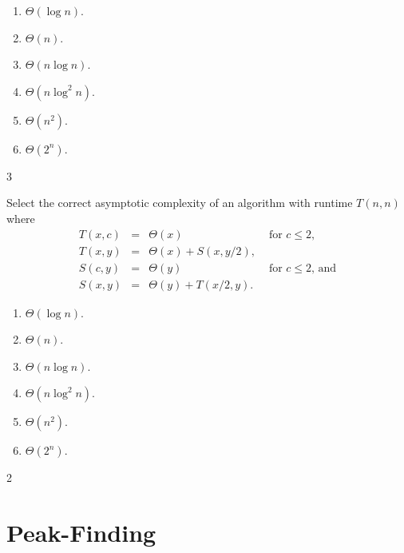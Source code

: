 \documentclass[12pt,twoside]{article}
\begin{document}
\begin{problems}
\begin{problemparts}
        \begin{enumerate}
            \item $\Theta(\log n)$.
            \item $\Theta(n)$.
            \item $\Theta(n \log n)$.
            \item $\Theta(n \log^2 n)$.
            \item $\Theta(n^2)$.
            \item $\Theta(2^n)$.
        \end{enumerate}

        \ifsolution \solution{}
            3
        \fi

        \problempart {}
        Select the correct asymptotic complexity
        of an algorithm with runtime $T(n, n)$
        where 
        $$
            \begin{array}{rcll}
                T(x, c) & = & \Theta(x)                 & \textrm{ for $c \le 2$},     \\
                T(x, y) & = & \Theta(x) + S(x, y / 2),                                 \\
                S(c, y) & = & \Theta(y)                 & \textrm{ for $c \le 2$, and} \\
                S(x, y) & = & \Theta(y) + T(x / 2, y).
            \end{array}
        $$

        \begin{enumerate}
            \item $\Theta(\log n)$.
            \item $\Theta(n)$.
            \item $\Theta(n \log n)$.
            \item $\Theta(n \log^2 n)$.
            \item $\Theta(n^2)$.
            \item $\Theta(2^n)$.
        \end{enumerate}

        \ifsolution \solution{}
            2
        \fi

    \end{problemparts}

    \section*{Peak-Finding}


\end{problems}
\end{document}
